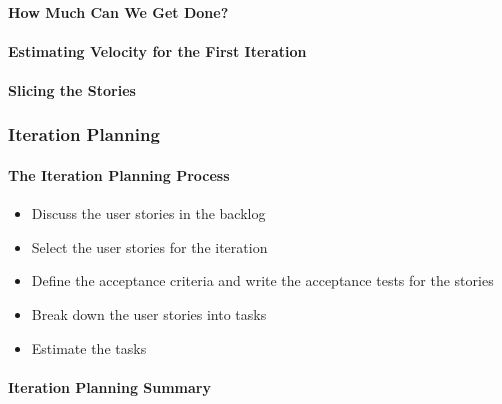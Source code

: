 \documentclass[letterpaper,10pt,english]{jupyterBook}
\begin{document}
\paragraph{How Much Can We Get Done?}
\label{\detokenize{APM/agile:how-much-can-we-get-done}}

\paragraph{Estimating Velocity for the First Iteration}
\label{\detokenize{APM/agile:estimating-velocity-for-the-first-iteration}}

\paragraph{Slicing the Stories}
\label{\detokenize{APM/agile:slicing-the-stories}}

\subsubsection{Iteration Planning}
\label{\detokenize{APM/agile:iteration-planning}}

\paragraph{The Iteration Planning Process}
\label{\detokenize{APM/agile:the-iteration-planning-process}}\begin{itemize}
\item {} 
\sphinxAtStartPar
Discuss the user stories in the backlog

\item {} 
\sphinxAtStartPar
Select the user stories for the iteration

\item {} 
\sphinxAtStartPar
Define the acceptance criteria and write the acceptance tests for the stories

\item {} 
\sphinxAtStartPar
Break down the user stories into tasks

\item {} 
\sphinxAtStartPar
Estimate the tasks

\end{itemize}


\paragraph{Iteration Planning Summary}
\label{\detokenize{APM/agile:iteration-planning-summary}}
\end{document}
